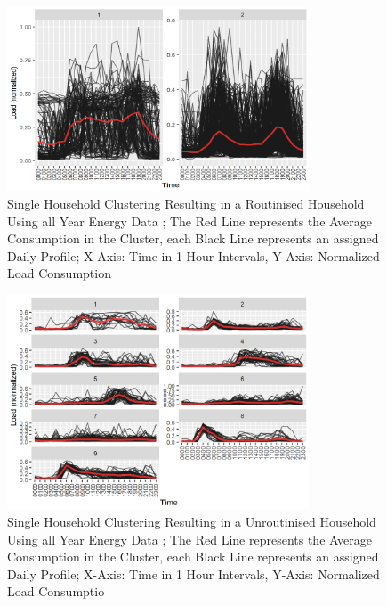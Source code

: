\begin{figure}
    \centering
    \includegraphics[width=0.8\textwidth]{figures/malatesta_hsop/malatesta_routinisedHousehold.jpg}
    \caption{Single Household Clustering Resulting in a Routinised Household Using all Year Energy Data \cite{MAL-HBP};
    The Red Line represents the Average Consumption in the Cluster, each Black Line represents an assigned Daily Profile;
    X-Axis: Time in 1 Hour Intervals, Y-Axis: Normalized Load Consumption}
    \label{fig:routinized_household}
\end{figure}

\begin{figure}
    \centering
    \includegraphics[width=0.8\textwidth]{figures/malatesta_hsop/malatesta_unroutinisedHousehold.jpg}
    \caption{Single Household Clustering Resulting in a Unroutinised Household Using all Year Energy Data \cite{MAL-HBP};
    The Red Line represents the Average Consumption in the Cluster, each Black Line represents an assigned Daily Profile;
    X-Axis: Time in 1 Hour Intervals, Y-Axis: Normalized Load Consumptio}
    \label{fig:non_routinized_household}
\end{figure}


